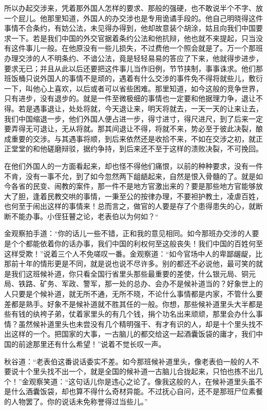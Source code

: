\documentclass[12pt,UTF8]{ctexbook}
\begin{document}
{{{所以办起交涉来，凭着那外国人怎样的要求、那般的强硬，也不敢说半个不字、放一个屁儿。他那里知道，外国人的办交涉也是专用诡谲手段的。他自己明晓得这件事情不合条约，有妨公法，未见得办得到，他却故意装个胡涂，姑且向我们中国要求一下。若是我们中国的外交官据着条约公法和他抗辩，他也就不来提起，只当没有这件事儿一般。在他原没有一些儿损失，不过费他一个照会就是了。万一个那班办理交涉的人不明条约、不谙公法，竟是轻轻易易的答应了下来，他就得步进步，要求无已；并且从此以后还要把这件事儿当作旧例，节节挟制，事事诛求。他们那班饭桶只说外国人的事情不是顽的，遇着有什么交涉的事件免不得将就些儿，敷衍一下，叫他心上喜欢，以后或者可以省些困难。那里知道，如今这般的竞争世界，只有进步，没有退步的。就是一件至微极细的事情也一定要和他据理力争，退让不得。若是遇事退让，处处将就，今天退让来，明天将就去，一天一天的让来让去，我们中国缩退一步，他们外国人便占进一步，得寸进寸，得尺进尺，到了后来一定要弄得无可退让，无从将就。那其间退让不得，将就不来，势必至于彼此决裂，酿成重要的交涉。与其遇事将顺，到后来依然还是收拾不来，不如在交涉之初，就正正堂堂的和他磋磨辩驳，据约争持，到后来还不至于这样的溃败决裂，不可挽回。

在他们外国人的一方面看起来，却也怪不得他们痛恨，以前的种种要求，没有一件不肯，没有一事不允，到了如今忽然两下龃龉起来，自然是恨入骨髓的了。就是如今各省的民变、闹教的案件，那一件不是地方官激出来的？要是那些地方官能够放大了胆，逢着民教交哄的事情，一秉至公的按律办理，不要袒护教土，凌虐百姓，也何至于闹出这样的事情来！总而言之，做官的人要是存了个患得患失的心，就断断不能办事。小侄狂瞽之论，老表伯以为何如？“

金观察拍手道：“你的话儿一些不错，正和我的意见相同。如今那班办交涉的人要是个个都能依着你的话办事，我们中国的利权何至这般丧失！我们中国的百姓何至这样受欺！”说着三个人不免嗟叹一番。金观察道：“如今官场中人的卑鄙龌龊，比那前十年的情形更是不同，就是说也说不尽许多。别的都还不必说他，最可笑的就是我们这班候补道，你只看全国行省里头那些最重要的差使，什么银元局、铜元局、铁路、矿务、军政、警军，那一处的总办、会办不是候补道当的？好象世上的人只要是个候补道，就无所不通，无所不晓，不论什么事情都是内家，不管什么要差都是熟手。好象不是候补道就不胜其任的一般。你想，那些候补道里头大半都是些有钱的纨袴子弟，仗着家里头的有几个钱，捐个功名出来顽顽，那里会办什么事情？虽然候补道里头也未尝没有几个精明强干、有才有识的人，却是十个里头找不出这样的一个。把国家的大事，一古脑儿的都交给这一起酒囊饭袋的庸才，我们中国的前途那里还有什么希望！”说着不觉长叹一声。

秋谷道：“老表伯这番说话委实不差。如今那班候补道里头，像老表伯一般的人不要说十个里头找不出一个，就是全国的候补道一古脑儿合拢起来，只怕也拣不出几个！”金观察笑道：“这句话儿你是违心之论了。像我这般的人，在候补道里头虽不是什么酒囊饭袋，却也算不得什么奇材异能。不过抚心自问，还不是那班尸位素餐的人物罢了。你的说话未免称誉得过当些儿。”

}}}
\end{document}
